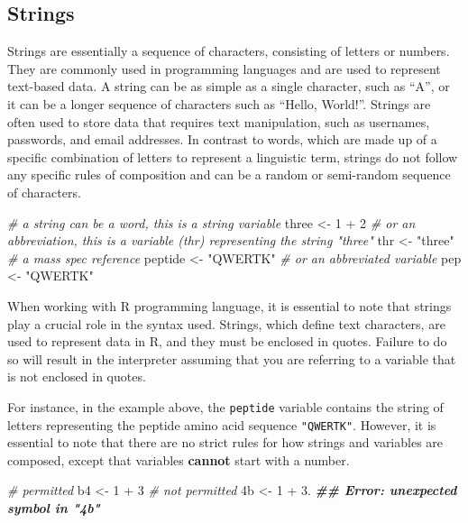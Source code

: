 \documentclass[
]{book}
\newenvironment{Shaded}{\begin{snugshade}}{\end{snugshade}}
\newcommand{\CommentTok}[1]{\textcolor[rgb]{0.56,0.35,0.01}{\textit{#1}}}
\newcommand{\DecValTok}[1]{\textcolor[rgb]{0.00,0.00,0.81}{#1}}
\newcommand{\DocumentationTok}[1]{\textcolor[rgb]{0.56,0.35,0.01}{\textbf{\textit{#1}}}}
\newcommand{\FloatTok}[1]{\textcolor[rgb]{0.00,0.00,0.81}{#1}}
\newcommand{\NormalTok}[1]{#1}
\newcommand{\OtherTok}[1]{\textcolor[rgb]{0.56,0.35,0.01}{#1}}
\newcommand{\SpecialCharTok}[1]{\textcolor[rgb]{0.00,0.00,0.00}{#1}}
\newcommand{\StringTok}[1]{\textcolor[rgb]{0.31,0.60,0.02}{#1}}
\begin{document}
\hypertarget{strings}{%
\subsection{Strings}\label{strings}}

Strings are essentially a sequence of characters, consisting of letters or numbers. They are commonly used in programming languages and are used to represent text-based data. A string can be as simple as a single character, such as ``A'', or it can be a longer sequence of characters such as ``Hello, World!''. Strings are often used to store data that requires text manipulation, such as usernames, passwords, and email addresses. In contrast to words, which are made up of a specific combination of letters to represent a linguistic term, strings do not follow any specific rules of composition and can be a random or semi-random sequence of characters.

\begin{Shaded}
\begin{Highlighting}[]
\CommentTok{\# a string can be a word, this is a string variable}
\NormalTok{three }\OtherTok{\textless{}{-}} \DecValTok{1} \SpecialCharTok{+} \DecValTok{2}
\CommentTok{\# or an abbreviation, this is a variable (thr) representing the string "three"}
\NormalTok{thr }\OtherTok{\textless{}{-}} \StringTok{"three"} 
\CommentTok{\# a mass spec reference}
\NormalTok{peptide }\OtherTok{\textless{}{-}} \StringTok{"QWERTK"}
\CommentTok{\# or an abbreviated variable}
\NormalTok{pep }\OtherTok{\textless{}{-}} \StringTok{"QWERTK"}
\end{Highlighting}
\end{Shaded}

When working with R programming language, it is essential to note that strings play a crucial role in the syntax used. Strings, which define text characters, are used to represent data in R, and they must be enclosed in quotes. Failure to do so will result in the interpreter assuming that you are referring to a variable that is not enclosed in quotes.

For instance, in the example above, the \texttt{peptide} variable contains the string of letters representing the peptide amino acid sequence \texttt{"QWERTK"}. However, it is essential to note that there are no strict rules for how strings and variables are composed, except that variables \textbf{cannot} start with a number.

\begin{Shaded}
\begin{Highlighting}[]
\CommentTok{\# permitted}
\NormalTok{b4 }\OtherTok{\textless{}{-}} \DecValTok{1} \SpecialCharTok{+} \DecValTok{3}
\CommentTok{\# not permitted}
\NormalTok{4b }\OtherTok{\textless{}{-}} \DecValTok{1} \SpecialCharTok{+} \FloatTok{3.} \DocumentationTok{\#\# Error: unexpected symbol in "4b"}
\end{Highlighting}
\end{Shaded}
\end{document}
